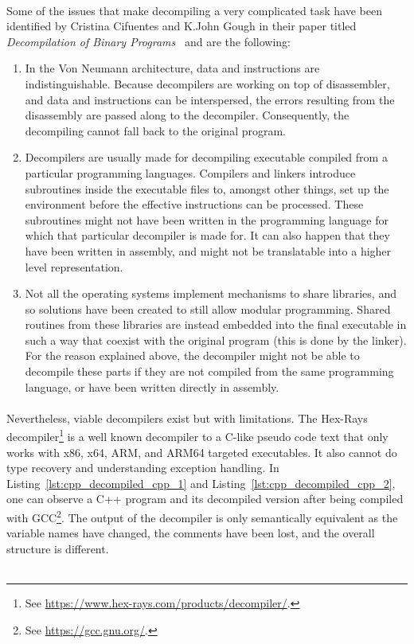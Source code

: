 \paragraph{}
Some of the issues that make decompiling a very complicated task have been identified by Cristina Cifuentes and K.John Gough in their paper titled \textit{Decompilation of Binary Programs}~\cite{cifuentes1995decompilation} and are the following:
\begin{enumerate}
	\item In the Von Neumann architecture, data and instructions are indistinguishable. Because decompilers are working on top of disassembler, and data and instructions can be interspersed, the errors resulting from the disassembly are passed along to the decompiler. Consequently, the decompiling cannot fall back to the original program.
	\item Decompilers are usually made for decompiling executable compiled from a particular programming languages. Compilers and linkers introduce subroutines inside the executable files to, amongst other things, set up the environment before the effective instructions can be processed. These subroutines might not have been written in the programming language for which that particular decompiler is made for. It can also happen that they have been written in assembly, and might not be translatable into a higher level representation.
	\item Not all the operating systems implement mechanisms to share libraries, and so solutions have been created to still allow modular programming. Shared routines from these libraries are instead embedded into the final executable in such a way that coexist with the original program (this is done by the linker). For the reason explained above, the decompiler might not be able to decompile these parts if they are not compiled from the same programming language, or have been written directly in assembly.
\end{enumerate}

\paragraph{}
Nevertheless, viable decompilers exist but with limitations. The Hex-Rays decompiler\footnote{See \url{https://www.hex-rays.com/products/decompiler/}.} is a well known decompiler to a C-like pseudo code text that only works with x86, x64, ARM, and ARM64 targeted executables. It also cannot do type recovery and understanding exception handling. In Listing~\ref{lst:cpp_decompiled_cpp_1} and Listing~\ref{lst:cpp_decompiled_cpp_2}, one can observe a C++ program and its decompiled version after being compiled with GCC\footnote{See \url{https://gcc.gnu.org/}.}. The output of the decompiler is only semantically equivalent as the variable names have changed, the comments have been lost, and the overall structure is different. \\ \\

